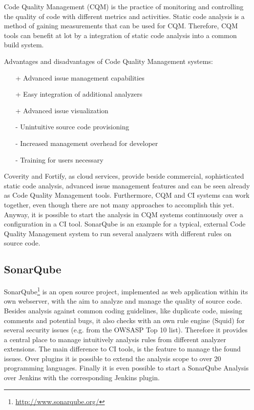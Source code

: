 \documentclass[conference]{IEEEtran}
\begin{document}
Code Quality Management (CQM) is the practice of monitoring and controlling the quality of code with different metrics and activities.
Static code analysis is a method of gaining measurements that can be used for CQM. Therefore, CQM tools can benefit at lot by a integration of static code analysis into a common build system.


Advantages and disadvantages of Code Quality Management systems:
\begin{itemize}
	\item[+] Advanced issue management capabilities
	\item[+] Easy integration of additional analyzers
	\item[+] Advanced issue visualization
	\item[-] Unintuitive source code provisioning
	\item[-] Increased management overhead for developer
	\item[-] Training for users necessary 
\end{itemize}

Coverity and Fortify, as cloud services, provide beside commercial, sophisticated static code analysis, advanced issue management features and can be seen already as Code Quality Management tools.
Furthermore, CQM and CI systems can work together, even though there are not many approaches to accomplish this yet. 
Anyway, it is possible to start the analysis in CQM systems continuously over a configuration in a CI tool.
SonarQube is an example for a typical, external Code Quality Management system to run several analyzers with different rules on source code.

\subsection{SonarQube}
\label{subsec:sonarqube}
SonarQube\footnote{\href{http://www.sonarqube.org/}{http://www.sonarqube.org/}} is an open source project, implemented as web application within its own webserver, with the aim to analyze and manage the quality of source code. 
Besides analysis against common coding guidelines, like duplicate code, missing comments and potential bugs, it also checks with an own rule engine (Squid) for several security issues (e.g. from the OWSASP Top 10 list).
Therefore it provides a central place to manage intuitively analysis rules from different analyzer extensions.
The main difference to CI tools, is the feature to manage the found issues.
Over plugins it is possible to extend the analysis scope to over 20 programming languages.
Finally it is even possible to start a SonarQube Analysis over Jenkins with the corresponding Jenkins plugin.
\end{document}
